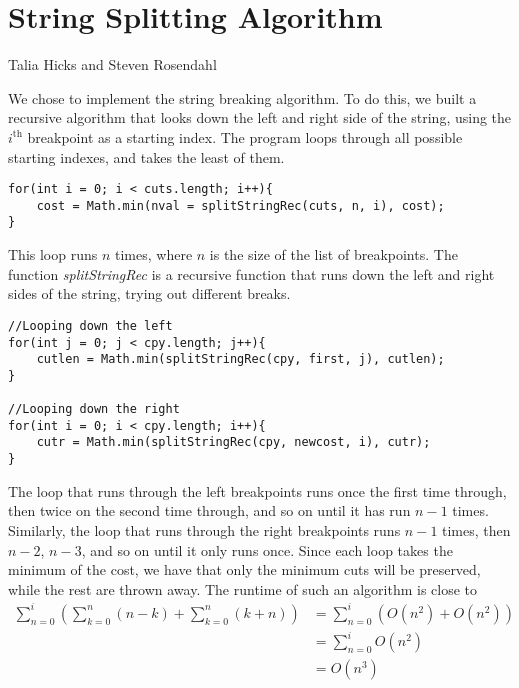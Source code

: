 \documentclass{hw}
\begin{document}
\section*{String Splitting Algorithm}
\noindent Talia Hicks and Steven Rosendahl

\vspace{1cm}

We chose to implement the string breaking algorithm. To do this, we built a recursive algorithm
that looks down the left and right side of the string, using the $i^{\text{th}}$ breakpoint as a
starting index. The program loops through all possible starting indexes, and takes the least of them.

\begin{verbatim}
for(int i = 0; i < cuts.length; i++){
    cost = Math.min(nval = splitStringRec(cuts, n, i), cost);
}
\end{verbatim}

This loop runs $n$ times, where $n$ is the size of the list of breakpoints. The function
\textit{splitStringRec} is a recursive function that runs down the left and right sides of the
string, trying out different breaks.

\begin{center}
\begin{verbatim}
//Looping down the left
for(int j = 0; j < cpy.length; j++){
    cutlen = Math.min(splitStringRec(cpy, first, j), cutlen);
}

//Looping down the right
for(int i = 0; i < cpy.length; i++){
    cutr = Math.min(splitStringRec(cpy, newcost, i), cutr);
}
\end{verbatim}
\end{center}

The loop that runs through the left breakpoints runs once the first time through, then twice on the
second time through, and so on until it has run $n-1$ times. Similarly, the loop that runs through the
right breakpoints runs $n-1$ times, then $n-2$, $n-3$, and so on until it only runs once. Since each
loop takes the minimum of the cost, we have that only the minimum cuts will be preserved, while the
rest are thrown away. The runtime of such an algorithm is close to
\begin{align*}
\sum_{n=0}^{i}\left(
\sum_{k=0}^{n}(n-k) +
\sum_{k=0}^{n}(k+n)
\right)
&=\sum_{n=0}^{i}\left(O(n^{2}) + O(n^{2})\right)\\
&=\sum_{n=0}^{i}O(n^{2})\\
&=O(n^{3})
\end{align*}
\end{document}
